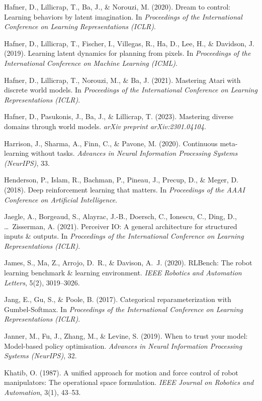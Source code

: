 \documentclass[12pt,a4paper,oneside]{report}
\begin{document}
Hafner, D., Lillicrap, T., Ba, J., \& Norouzi, M. (2020). Dream to control: Learning behaviors by latent imagination. In \emph{Proceedings of the International Conference on Learning Representations (ICLR)}.

Hafner, D., Lillicrap, T., Fischer, I., Villegas, R., Ha, D., Lee, H., \& Davidson, J. (2019). Learning latent dynamics for planning from pixels. In \emph{Proceedings of the International Conference on Machine Learning (ICML)}.

Hafner, D., Lillicrap, T., Norouzi, M., \& Ba, J. (2021). Mastering Atari with discrete world models. In \emph{Proceedings of the International Conference on Learning Representations (ICLR)}.

Hafner, D., Pasukonis, J., Ba, J., \& Lillicrap, T. (2023). Mastering diverse domains through world models. \emph{arXiv preprint arXiv:2301.04104}.

Harrison, J., Sharma, A., Finn, C., \& Pavone, M. (2020). Continuous meta-learning without tasks. \emph{Advances in Neural Information Processing Systems (NeurIPS)}, 33.

Henderson, P., Islam, R., Bachman, P., Pineau, J., Precup, D., \& Meger, D. (2018). Deep reinforcement learning that matters. In \emph{Proceedings of the AAAI Conference on Artificial Intelligence}.

Jaegle, A., Borgeaud, S., Alayrac, J.-B., Doersch, C., Ionescu, C., Ding, D., \ldots~Zisserman, A. (2021). Perceiver IO: A general architecture for structured inputs \& outputs. In \emph{Proceedings of the International Conference on Learning Representations (ICLR)}.

James, S., Ma, Z., Arrojo, D.~R., \& Davison, A.~J. (2020). RLBench: The robot learning benchmark \& learning environment. \emph{IEEE Robotics and Automation Letters}, 5(2), 3019--3026.

Jang, E., Gu, S., \& Poole, B. (2017). Categorical reparameterization with Gumbel-Softmax. In \emph{Proceedings of the International Conference on Learning Representations (ICLR)}.

Janner, M., Fu, J., Zhang, M., \& Levine, S. (2019). When to trust your model: Model-based policy optimisation. \emph{Advances in Neural Information Processing Systems (NeurIPS)}, 32.

Khatib, O. (1987). A unified approach for motion and force control of robot manipulators: The operational space formulation. \emph{IEEE Journal on Robotics and Automation}, 3(1), 43--53.
\end{document}
